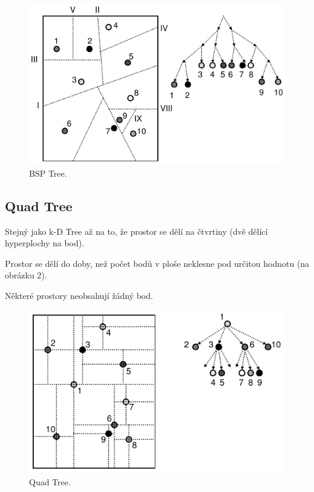 \begin{figure}[H]
    \centering
    \includegraphics[width=0.75\linewidth]{bsp_tree.pdf}
    \caption{BSP Tree.}
\end{figure}

\subsection{Quad Tree}

\begin{compactitem}
    \item Stejný jako k-D Tree až na to, že prostor se dělí na čtvrtiny (dvě dělící hyperplochy na bod).
    \item Prostor se dělí do doby, než počet bodů v ploše neklesne pod určitou hodnotu (na obrázku 2).
    \item Některé prostory neobsahují žádný bod.
\end{compactitem}

\begin{figure}[H]
    \centering
    \includegraphics[width=0.75\linewidth]{quad_tree.pdf}
    \caption{Quad Tree.}
\end{figure}


